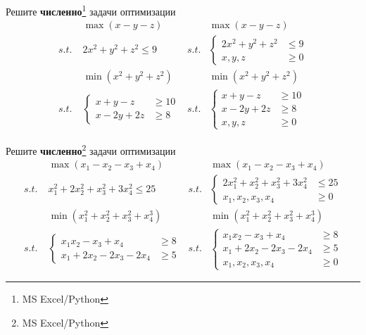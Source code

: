 \begin{exercise}
Решите \textbf{численно}\footnote{MS Excel/Python} задачи оптимизации
\begin{align*}
	&\max (x-y-z) & &\max (x-y-z) \\
	s.t.\;& 2x^2+y^2+z^2\leq 9 &
	s.t.&\left\{\begin{aligned}
		2x^2+y^2+z^2 &\leq 9 \\ x,y,z&\geq 0 
	\end{aligned}\right. \\
	&\min (x^2+y^2+z^2) & &\min(x^2+y^2+z^2) \\
	s.t.&\left\{\begin{aligned}
		x+y-z &\geq 10 \\ x-2y+2z&\geq 8 
	\end{aligned}\right. &
	s.t.&\left\{\begin{aligned}
		x+y-z &\geq 10 \\ x-2y+2z&\geq 8 \\ x,y,z &\geq0 
	\end{aligned}\right.
\end{align*}
\end{exercise}

\begin{exercise}
Решите \textbf{численно}\footnote{MS Excel/Python} задачи оптимизации
\begin{align*}
	&\max (x_1-x_2-x_3+x_4) & &\max (x_1-x_2-x_3+x_4) \\
	s.t.\;& x_1^2+2x_2^2+x_3^2+3x_4^2\leq 25 &
	s.t.&\left\{\begin{aligned}
		2x_1^2+x_2^2+x_3^2+3x_4^2 &\leq 25 \\ x_1,x_2,x_3,x_4&\geq 0 
	\end{aligned}\right. \\
	&\min (x_1^2+x_2^2+x_3^2+x_4^3) & &\min(x_1^2+x_2^2+x_3^2+x_4^3) \\
	s.t.&\left\{\begin{aligned}
		x_1x_2-x_3+x_4 &\geq 8 \\ x_1+2x_2-2x_3-2x_4&\geq 5 
	\end{aligned}\right. &
	s.t.&\left\{\begin{aligned}
		x_1x_2-x_3+x_4 &\geq 8 \\ x_1+2x_2-2x_3-2x_4&\geq 5 \\ 
		x_1,x_2,x_3,x_4 &\geq0 
	\end{aligned}\right.
\end{align*}
\end{exercise}

